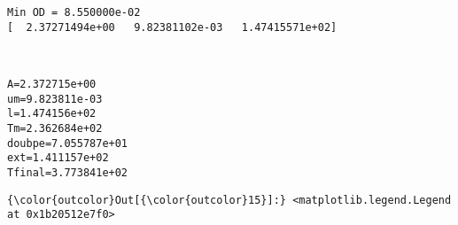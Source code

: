 \documentclass[11pt]{article}
\begin{document}
    \begin{Verbatim}[commandchars=\\\{\}]
Min OD = 8.550000e-02
[  2.37271494e+00   9.82381102e-03   1.47415571e+02]

    \end{Verbatim}

    \begin{center}
    \end{center}
    { \hspace*{\fill} \\}
    
    \begin{Verbatim}[commandchars=\\\{\}]
A=2.372715e+00
um=9.823811e-03
l=1.474156e+02
Tm=2.362684e+02
doubpe=7.055787e+01
ext=1.411157e+02
Tfinal=3.773841e+02

    \end{Verbatim}

            \begin{Verbatim}[commandchars=\\\{\}]
{\color{outcolor}Out[{\color{outcolor}15}]:} <matplotlib.legend.Legend at 0x1b20512e7f0>
\end{Verbatim}
        
    \begin{center}
    \end{center}
    { \hspace*{\fill} \\}
    
    \begin{center}
    \end{center}
    { \hspace*{\fill} \\}
    
\end{document}
